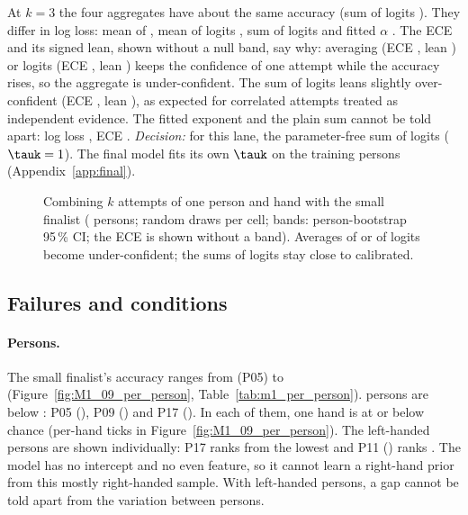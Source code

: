 At $k = 3$ the four aggregates have about the same accuracy (sum of logits
). They differ in log loss: mean of \pright{}
, mean of logits ,
sum of logits  and fitted $\alpha$
. The ECE and its signed lean, shown without a null
band, say why: averaging \pright{} (ECE , lean
) or logits (ECE ,
lean ) keeps the confidence of one attempt while the
accuracy rises, so the aggregate is under-confident. The sum of logits leans slightly over-confident
(ECE , lean ),
as expected for correlated attempts treated as independent evidence. The fitted exponent and the plain
sum cannot be told apart: log loss , ECE
. \emph{Decision:} for this lane, the parameter-free sum of
logits ($\tauk = 1$). The final model fits its own $\tauk$ on the training persons
(Appendix~\ref{app:final}).

\begin{figure}[tbp]
  \centering
  \caption{Combining $k$ attempts of one person and hand with the small finalist
  ( persons;  random draws per cell; bands: person-bootstrap
  95\,\% CI; the ECE is shown without a band). Averages of \pright{} or of logits become
  under-confident; the sums of logits stay close to calibrated.}
  \label{fig:M1_12_k_attempts}
\end{figure}


\FloatBarrier
\subsection{Failures and conditions}\label{app:m1:failures}

\paragraph{Persons.} The small finalist's accuracy ranges from  (P05) to
 (Figure~\ref{fig:M1_09_per_person}, Table~\ref{tab:m1_per_person}).
 persons are below : P05 (), P09
() and P17 (). In each of them, one hand is at or below
chance (per-hand ticks in Figure~\ref{fig:M1_09_per_person}).
The  left-handed persons are shown individually: P17 ranks
 from the lowest and P11 () ranks
. The model has no intercept and no even feature, so it cannot learn a
right-hand prior from this mostly right-handed sample. With  left-handed persons,
a gap cannot be told apart from the variation between persons.

